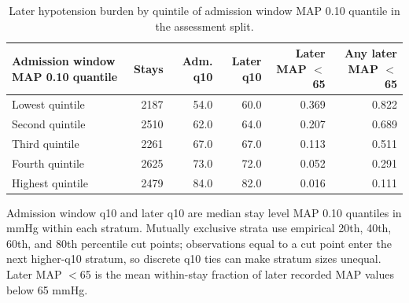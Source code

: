 \begin{table}[!htbp]
\caption{Later hypotension burden by quintile of admission window MAP 0.10 quantile in the assessment split.}
\label{tab:admission_q10_strata}
\centering
\begin{tabular}{lrrrrr}
\hline
Admission window MAP 0.10 quantile & Stays & Adm. q10 & Later q10 & Later MAP $<$65 & Any later MAP $<$65\\
\hline
Lowest quintile & 2187 & 54.0 & 60.0 & 0.369 & 0.822\\
Second quintile & 2510 & 62.0 & 64.0 & 0.207 & 0.689\\
Third quintile & 2261 & 67.0 & 67.0 & 0.113 & 0.511\\
Fourth quintile & 2625 & 73.0 & 72.0 & 0.052 & 0.291\\
Highest quintile & 2479 & 84.0 & 82.0 & 0.016 & 0.111\\
\hline
\end{tabular}
\par\smallskip
\footnotesize{Admission window q10 and later q10 are median stay level MAP 0.10 quantiles in mmHg within each stratum. Mutually exclusive strata use empirical 20th, 40th, 60th, and 80th percentile cut points; observations equal to a cut point enter the next higher-q10 stratum, so discrete q10 ties can make stratum sizes unequal. Later MAP $<$65 is the mean within-stay fraction of later recorded MAP values below 65 mmHg.}
\end{table}
